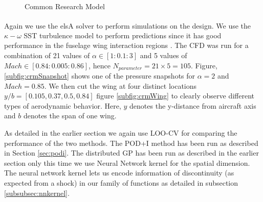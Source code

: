 \begin{figure}[!ht]
  \centering
  \quad
  \caption{Common Research Model}
\end{figure}

Again we use the elsA\textsuperscript{\textregistered} solver to perform simulations on the design. We use the \(\kappa - \omega\) SST turbulence model to perform predictions since it has good performance in the fuselage wing interaction regions \cite{menter2003ten, vassberg2014summary}. The CFD was run for a combination of 21 values of \(\alpha \in [1: 0.1: 3]\) and 5 values of \(Mach \in [0.84: 0.005: 0.86]\), hence \(N_{parameter} = 21\times5 = 105\). Figure, \ref{subfig:crmSnapshot} shows one of the pressure snapshots for \(\alpha = 2\) and \(Mach = 0.85\). We then cut the wing at four distinct locations \(y/b = [0.105, 0.37, 0.5, 0.84]\) figure \ref{subfig:crmWing} to clearly observe different types of aerodynamic behavior. Here, \(y\) denotes the y-distance from aircraft axis and \(b\) denotes the span of one wing. 

As detailed in the earlier section we again use LOO-CV for comparing the performance of the two methods. The POD+I method has been run as described in Section \ref{sec:podi}. The distributed GP has been run as described in the earlier section only this time we use Neural Network kernel for the spatial dimension. The neural network kernel lets us encode information of discontinuity (as expected from a shock) in our family of functions as detailed in subsection \ref{subsubsec:nnkernel}. 


